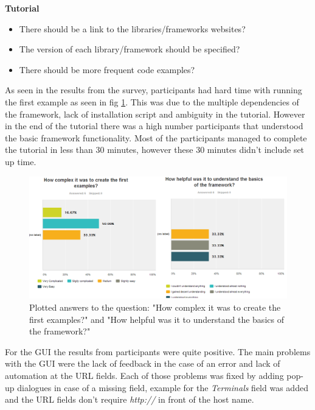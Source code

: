\textbf{Tutorial}
\begin{itemize}
\item There should be a link to the libraries/frameworks websites?
\item The version of each library/framework should be specified?
\item There should be more frequent code examples?
\end{itemize}

As seen in the results from the survey, participants had hard time with running the first example as seen in fig \ref{fig:firstex}. This was due to the multiple dependencies of the
framework, lack of installation script and ambiguity in the tutorial. However
in the end of the tutorial there was a high number participants that understood the basic framework functionality. Most of the participants managed to complete the tutorial
in less than 30 minutes, however these 30 minutes didn't include set up time.

\begin{figure}[htp]
\centering
\includegraphics[scale=0.5]{Figures/q1.png}
\caption{Plotted answers to the question: "How complex it was to create the first examples?" and "How helpful was it to understand the basics of the framework?" }
\label{fig:firstex}
\end{figure}

For the GUI the results from participants were quite positive. The main problems with the GUI were the lack of feedback in the case of an error and lack of automation
at the URL fields. Each of those problems was fixed by adding pop-up dialogues in case of a missing field, example for the \textit{Terminals} field was added and the
URL fields don't require \textit{http://} in front of the host name.